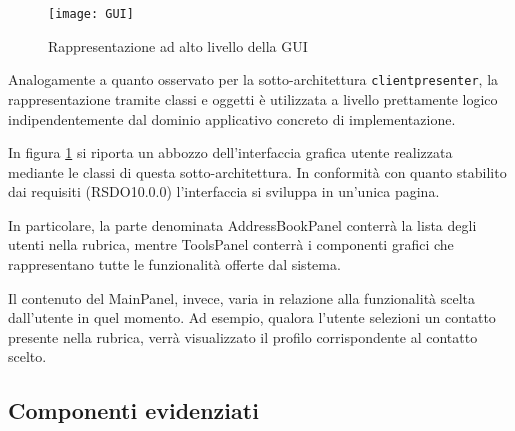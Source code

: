 \begin{figure}[h]
  \centering
  \texttt{[image: GUI]}
  \caption{Rappresentazione ad alto livello della GUI}\label{fig:gui}
\end{figure}

Analogamente a quanto osservato per la sotto-architettura \texttt{clientpresenter}, la rappresentazione tramite classi e oggetti è utilizzata a livello prettamente logico indipendentemente dal dominio applicativo concreto di implementazione.

In figura \ref{fig:gui} si riporta un abbozzo dell'interfaccia grafica utente realizzata mediante le classi di questa sotto-architettura. In conformità con quanto stabilito dai requisiti (RSDO10.0.0) l'interfaccia si sviluppa in un'unica pagina.

In particolare, la parte denominata AddressBookPanel conterrà la lista degli utenti nella rubrica, mentre ToolsPanel conterrà i componenti grafici che rappresentano tutte le funzionalità offerte dal sistema. 

Il contenuto del MainPanel, invece, varia in relazione alla funzionalità scelta dall'utente in quel momento. Ad esempio, qualora l'utente selezioni un contatto presente nella rubrica, verrà visualizzato il profilo corrispondente al contatto scelto.

\subsection{Componenti evidenziati}

